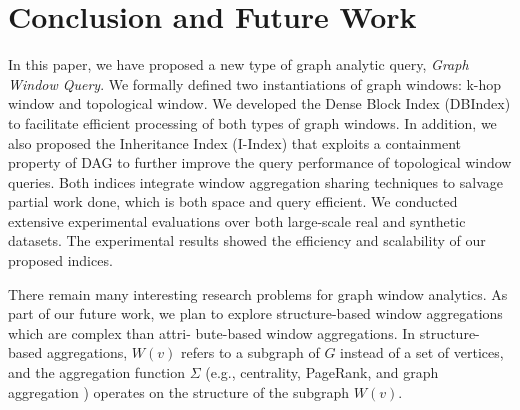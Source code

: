 \section{Conclusion and Future Work}
In this paper, we have proposed a new type of graph analytic query,  \emph{Graph Window Query}. We formally defined two instantiations of graph windows: k-hop window and topological window.
We developed the Dense Block Index (DBIndex) to facilitate efficient processing of both types of graph windows. In addition, we also proposed the Inheritance Index (I-Index) that exploits a containment property of DAG to further improve the query performance of topological window queries. Both indices integrate window aggregation sharing techniques to salvage partial work done, which is both space and query efficient. We conducted extensive experimental evaluations over both large-scale real and synthetic datasets. The experimental results showed the efficiency and scalability of our proposed indices. 


There remain many interesting research problems for graph window analytics. 
As part of our future work, we plan to explore structure-based window aggregations
which are complex than attri- bute-based window aggregations.
In structure-based aggregations, $W(v)$ refers to a subgraph of $G$ instead of a set of vertices,
and the aggregation function $\Sigma$ (e.g., centrality, PageRank, and {graph aggregation} \cite{wang2014pagrol,zhao2011graph}) operates on the structure of the subgraph $W(v)$. 
